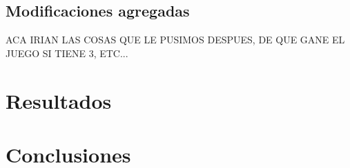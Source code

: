 \documentclass[11pt, spanish]{article}
\begin{document}
\subsection{Modificaciones agregadas}
ACA IRIAN LAS COSAS QUE LE PUSIMOS DESPUES, DE QUE GANE EL JUEGO SI TIENE 3, ETC...

\section{Resultados}

\section{Conclusiones}
\end{document}
